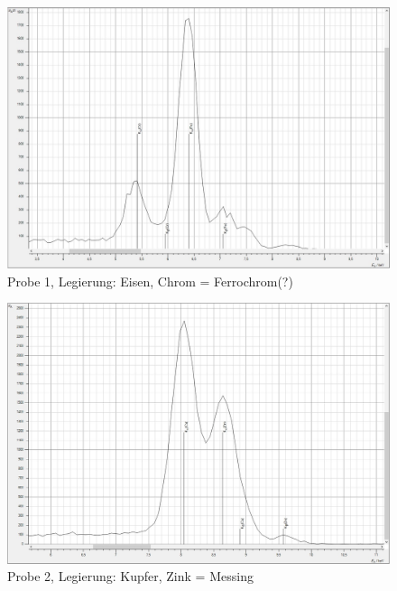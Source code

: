 \begin{figure}[H]
  \centering
  \includegraphics[width=\textwidth]{files/legierung1.jpg}
  \caption{Probe 1, Legierung: Eisen, Chrom = Ferrochrom(?)}
  \label{fig:legierung1}
\end{figure}


\begin{figure}[H]
  \centering
  \includegraphics[width=\textwidth]{files/legierung2.jpg}
  \caption{Probe 2, Legierung: Kupfer, Zink = Messing}
  \label{fig:legierung2}
\end{figure}

